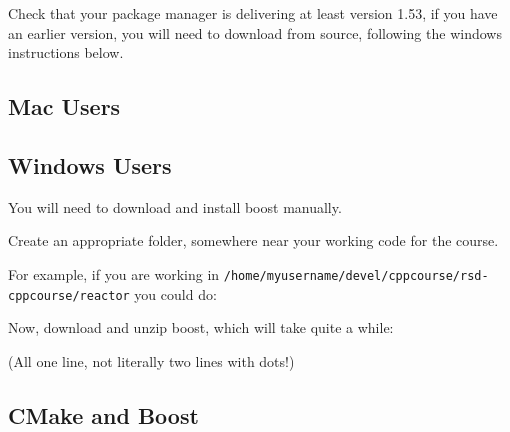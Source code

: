 Check that your package manager is delivering at least version 1.53, if
you have an earlier version, you will need to download from source,
following the windows instructions below.

\subsection{Mac Users}\label{mac-users}

\begin{Shaded}
\begin{Highlighting}[]
 
\end{Highlighting}
\end{Shaded}

\subsection{Windows Users}\label{windows-users}

You will need to download and install boost manually.

Create an appropriate folder, somewhere near your working code for the
course.

For example, if you are working in
\texttt{/home/myusername/devel/cppcourse/rsd-cppcourse/reactor} you
could do:

\begin{Shaded}
\begin{Highlighting}[]
 
 
\end{Highlighting}
\end{Shaded}

Now, download and unzip boost, which will take quite a while:

\begin{Shaded}
\begin{Highlighting}[]
 
         \KeywordTok{>} 
 
\end{Highlighting}
\end{Shaded}

(All one line, not literally two lines with dots!)

\subsection{CMake and Boost}\label{cmake-and-boost}

